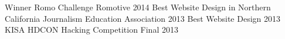 \begin{cvhonors}
  \cvhonor
    {Winner Romo Challenge}
    {Romotive}
    {}
    {2014}
  \cvhonor
    {Best Website Design in Northern California}
    {Journalism Education Association}
    {}
    {2013}
  \cvhonor
    {Best Website Design 2013}
    {KISA HDCON Hacking Competition Final}
    {}
    {2013}
\end{cvhonors}
